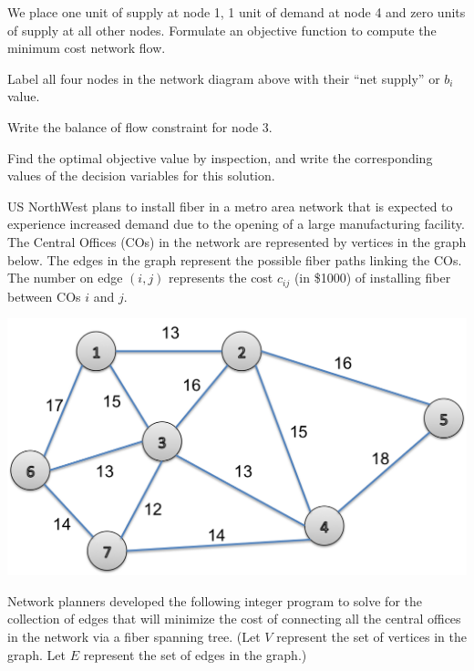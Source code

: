 \begin{parts}
We  place one unit of supply at node 1, 1 unit of demand at node 4 and zero units of supply at all other nodes. Formulate an objective function to compute the minimum cost network flow. 

\vspace{2.75cm}

 Label all four nodes in the network diagram above with their ``net supply'' or $b_i$ value.

\vspace{1.55cm}

 Write the balance of flow constraint for node 3.

\vfill

 Find the optimal objective value by inspection, and write the corresponding values of the decision variables for this solution.

\vfill

\end{parts}
\newpage

US NorthWest plans to install fiber in a metro area network that is expected to experience increased demand due to the opening of a large manufacturing facility.  The Central Offices (COs) in the network are represented by vertices in the graph below.  The edges in the graph represent the possible fiber paths linking the COs.  The number on edge $(i,j)$ represents the cost $c_{ij}$ (in \$1000) of installing fiber between COs $i$ and $j$.

\begin{center}
\includegraphics[width = .5\textwidth]{uswest_network}
\end{center}

Network planners developed the following integer program to solve for the collection of edges that will minimize the cost of connecting all the central offices in the network via a fiber spanning tree.  (Let $V$ represent the set of vertices in the graph.  Let $E$ represent the set of edges in the graph.)

